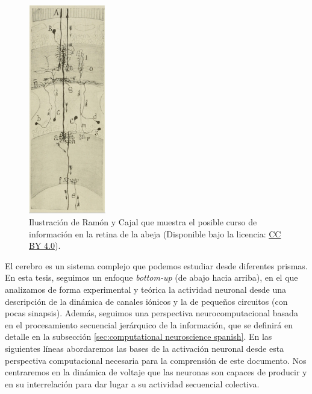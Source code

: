 \begin{figure}[htb!]
    \centering
    \includegraphics[width=0.3\textwidth]{img/intro/cajal-flow_small.jpg}
    \caption{Ilustración de Ramón y Cajal que muestra el posible curso de información en la retina de la abeja \parencite{ramonycajal_sobre_1915} (Disponible bajo la licencia: \href{https://creativecommons.org/licenses/by-sa/4.0/}{CC BY 4.0}).}
    \label{fig:cajal-neuron spanish}
\end{figure}

El cerebro es un sistema complejo que podemos estudiar desde diferentes prismas. En esta tesis, seguimos un enfoque \textit{bottom-up} (de abajo hacia arriba), en el que analizamos de forma experimental y teórica la actividad neuronal desde una descripción de la dinámica de canales iónicos y la de pequeños circuitos (con pocas sinapsis). Además, seguimos una perspectiva neurocomputacional basada en el procesamiento secuencial jerárquico de la información, que se definirá en detalle en la subsección \ref{sec:computational neuroscience spanish}. En las siguientes líneas abordaremos las bases de la activación neuronal desde esta perspectiva computacional necesaria para la comprensión de este documento. Nos centraremos en la dinámica de voltaje que las neuronas son capaces de producir y en su interrelación para dar lugar a su actividad secuencial colectiva.


